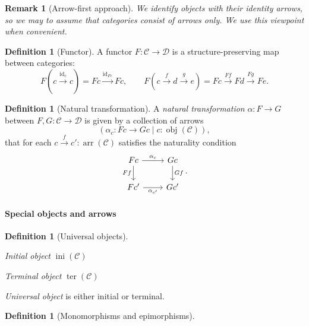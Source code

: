 \documentclass[12pt]{article}
\newtheorem{remark}[theorem]{Remark}
\theoremstyle{definition}
\newtheorem{definition}[theorem]{Definition}
\newcommand{\mc}{\mathcal}
\newcommand{\ini}{\operatorname{ini}}
\newcommand{\ter}{\operatorname{ter}}
\newcommand{\id}{\mathrm{id}}
\newcommand{\obj}{\operatorname{obj}}
\newcommand{\arr}{\operatorname{arr}}
\newcommand{\xto}{\xrightarrow}
\begin{document}
\begin{remark}[Arrow-first approach]
    We identify objects with their identity arrows, so we may to assume that categories consist of arrows only. We use this viewpoint when convenient. 
\end{remark}

\begin{definition}[Functor]
    A functor $F: \mc{C} \to \mc{D}$ is a structure-preserving map between categories:
    \[
        F(c \xto{\id_c} c) = Fc \xto{\id_{Fc}} Fc, \qquad F(c \xto{f} d \xto{g} e) = Fc \xto{Ff} Fd \xto{Fg} Fe.
    \]
\end{definition}

\begin{definition}[Natural transformation] A \emph{natural transformation} $\alpha: F \to G$ between $F, G: \mc{C} \to \mc{D}$ is given by a collection of arrows 
\[
    (\alpha_c: Fc \to Gc \mid c: \obj(\mc{C})),
\]
that for each $c \xto{f} c': \arr(\mc{C})$ satisfies the 
naturality condition
\[\begin{tikzcd}
	Fc & Gc \\
	{Fc'} & {Gc'}
	\arrow["{\alpha_c}", from=1-1, to=1-2]
	\arrow["Ff"', from=1-1, to=2-1]
	\arrow["Gf", from=1-2, to=2-2]
	\arrow["{\alpha_{c'}}"', from=2-1, to=2-2]
\end{tikzcd}.\]
\end{definition}

\paragraph{Special objects and arrows}

\begin{definition}[Universal objects]
\hfill
\begin{distinct}
    \item \emph{Initial object} $\ini(\mc{C})$
    \item \emph{Terminal object} $\ter(\mc{C})$
    \item \emph{Universal object} is either initial or terminal.
\end{distinct}
\end{definition}

\begin{definition}[Monomorphisms and epimorphisms]
    
\end{definition}
\end{document}
